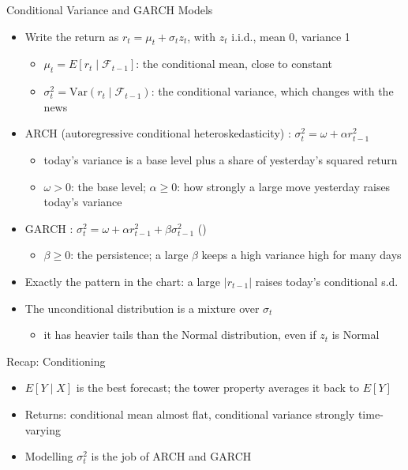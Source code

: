\begin{frame}{Conditional Variance and GARCH Models}
\itemsize{\footnotesize}
\begin{itemize}
    \item Write the return as $r_t = \mu_t + \sigma_t z_t$, with $z_t$ i.i.d., mean 0, variance 1
    \begin{itemize}
        \item $\mu_t = E[r_t \mid \mathcal{F}_{t-1}]$: the conditional mean, close to constant
        \item $\sigma_t^2 = \text{Var}(r_t \mid \mathcal{F}_{t-1})$: the conditional variance, which changes with the news
    \end{itemize}
    \item ARCH (autoregressive conditional heteroskedasticity) : $\sigma_t^2 = \omega + \alpha r_{t-1}^2$
    \begin{itemize}
        \item today's variance is a base level plus a share of yesterday's squared return
        \item $\omega > 0$: the base level; $\alpha \ge 0$: how strongly a large move yesterday raises today's variance
    \end{itemize}
    \item GARCH : $\sigma_t^2 = \omega + \alpha r_{t-1}^2 + \beta\sigma_{t-1}^2$ ()
    \begin{itemize}
        \item $\beta \ge 0$: the persistence; a large $\beta$ keeps a high variance high for many days
    \end{itemize}
    \item Exactly the pattern in the chart: a large $|r_{t-1}|$ raises today's conditional s.d.
    \item The unconditional distribution is a mixture over $\sigma_t$
    \begin{itemize}
        \item it has heavier tails than the Normal distribution, even if $z_t$ is Normal
    \end{itemize}
\end{itemize}
\end{frame}

\begin{frame}{Recap: Conditioning}
\itemsize{\small}
\begin{itemize}
    \item $E[Y \mid X]$ is the best forecast; the tower property averages it back to $E[Y]$
    \item Returns: conditional mean almost flat, conditional variance strongly time-varying
    \item Modelling $\sigma_t^2$ is the job of ARCH and GARCH
\end{itemize}
\end{frame}


